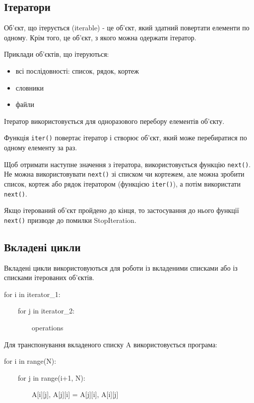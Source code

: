 \subsection{Ітератори} 
\begin{frame}
Об'єкт, що ітерується (iterable) - це об'єкт, який здатний повертати елементи по одному. Крім того, це об'єкт, з якого можна одержати ітератор.

Приклади об'єктів, що ітеруються:

\begin{itemize}
  \item всі послідовності: список, рядок, кортеж
  \item словники
  \item файли 
\end{itemize}
    
Ітератор використовується для одноразового перебору елементів об'єкту.
\end{frame}

\begin{frame}
Функція \texttt{iter()} повертає ітератор і створює об'єкт, який може перебиратися по одному елементу за раз.

Щоб отримати наступне значення з ітератора, використовується функцію \texttt{next()}. Не можна використовувати \texttt{next()} зі списком чи кортежем, але можна зробити список, кортеж або рядок ітератором (функцією \texttt{iter()}), а потім використати \texttt{next()}.

Якщо ітерований об'єкт пройдено до кінця, то застосування до нього функції \texttt{next()} призводе до помилки StopIteration.
\end{frame}

\subsection{Вкладені цикли} 
\begin{frame}
Вкладені цикли використовуються для роботи із вкладеними списками або із списками ітерованих об'єктів.

\huge{
for i in iterator\_1:

~~~~for j in iterator\_2:

~~~~~~~~operations
}
\end{frame}

\begin{frame}
Для транспонування вкладеного списку A  використовується програма:

for i in range(N):

~~~~for j in range(i+1, N):

~~~~~~~~A[i][j], A[j][i] = A[j][i], A[i][j]
\end{frame}


